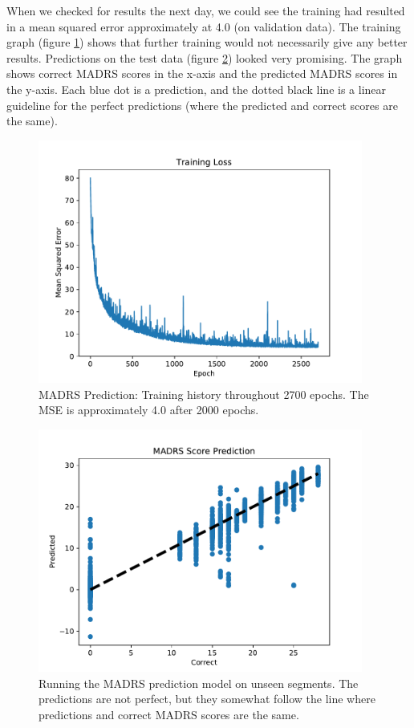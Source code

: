 When we checked for results the next day, we could see the training had resulted in a mean squared error approximately at 4.0 (on validation data). The training graph (figure \ref{figure:madrs_prediction_history}) shows that further training would not necessarily give any better results. Predictions on the test data (figure \ref{figure:madrs_prediction_testset}) looked very promising. The graph shows correct MADRS scores in the x-axis and the predicted MADRS scores in the y-axis. Each blue dot is a prediction, and the dotted black line is a linear guideline for the perfect predictions (where the predicted and correct scores are the same). 

\begin{figure}
\begin{center}
      \includegraphics[height=8cm]{img/madrs_prediction/train_history.pdf}
      \caption{MADRS Prediction: Training history throughout 2700 epochs. The MSE is approximately 4.0 after 2000 epochs.}
      \label{figure:madrs_prediction_history}
\end{center}
\end{figure}

\begin{figure}
\begin{center}
      \includegraphics[height=8cm]{img/madrs_prediction/predictions.pdf}
      \caption{Running the MADRS prediction model on unseen segments. The predictions are not perfect, but they somewhat follow the line where predictions and correct MADRS scores are the same.}
      \label{figure:madrs_prediction_testset}
\end{center}
\end{figure}
\newpage

